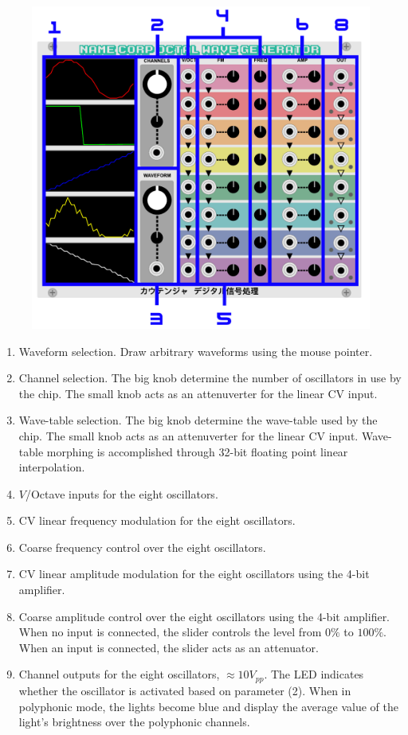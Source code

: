 \documentclass[12pt,letter]{article}
\begin{document}
\begin{figure}[!htp]
\centering
\includegraphics{Interface}
\end{figure}

\begin{enumerate}
  \item Waveform selection. Draw arbitrary waveforms using the mouse pointer.
  \item Channel selection. The big knob determine the number of oscillators in use by the chip. The small knob acts as an attenuverter for the linear CV input.
  \item Wave-table selection. The big knob determine the wave-table used by the chip. The small knob acts as an attenuverter for the linear CV input. Wave-table morphing is accomplished through 32-bit floating point linear interpolation.
  \item $V$/Octave inputs for the eight oscillators.
  \item CV linear frequency modulation for the eight oscillators.
  \item Coarse frequency control over the eight oscillators.
  \item CV linear amplitude modulation for the eight oscillators using the 4-bit amplifier.
  \item Coarse amplitude control over the eight oscillators using the 4-bit amplifier. When no input is connected, the slider controls the level from $0\%$ to $100\%$. When an input is connected, the slider acts as an attenuator.
  \item Channel outputs for the eight oscillators, ${\approx}10V_{pp}$. The LED indicates whether the oscillator is activated based on parameter (2). When in polyphonic mode, the lights become blue and display the average value of the light's brightness over the polyphonic channels.
\end{enumerate}


\clearpage
\renewcommand\refname{References \& Acknowledgments}
\nocite{*}


\end{document}
